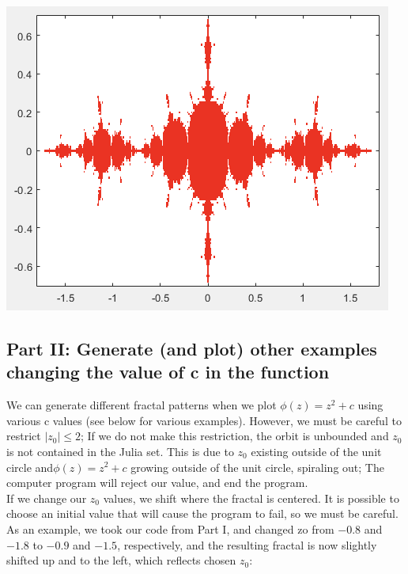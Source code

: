 \documentclass[11pt]{article}
\theoremstyle{plain}
\theoremstyle{definition}
\begin{document}
\begin{center}
	\includegraphics*[scale = 0.5]{Plot1.png}
\end{center}

\subsection*{Part II: Generate (and plot) other examples changing the value of c in the function}

We can generate different fractal patterns when we plot $ \phi(z) = z^2 + c $ using various c values (see below for various examples). However, we must be careful to restrict $ |z_0| \le 2 $; If we do not make this restriction, the orbit is unbounded and $ z_0 $ is not contained in the Julia set. This is due to $ z_0 $ existing outside of the unit circle and$ \phi(z) = z^2 + c $ growing outside of the unit circle, spiraling out; The computer program will reject our value, and end the program.\\

If we change our $ z_0 $ values, we shift where the fractal is centered. It is possible to choose an initial value that will cause the program to fail, so we must be careful.
As an example, we took our code from Part I, and changed zo from $ -0.8 $ and $ -1.8 $ to $ -0.9 $ and $ -1.5 $, respectively,  and the resulting fractal is now slightly shifted up and to the left, which reflects chosen $ z_0 $:
\end{document}
